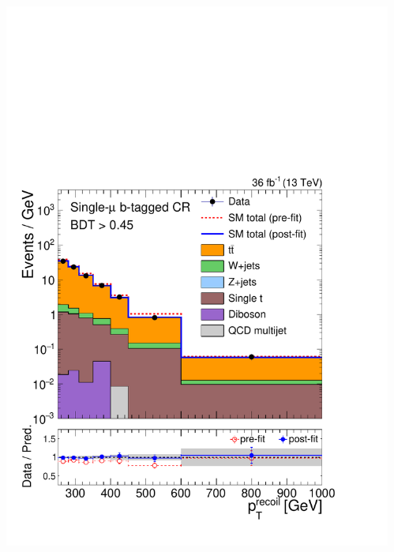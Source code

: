\documentclass[aspectratio=169,xcolor=dvipsnames,,table,compress]{beamer}
\begin{document}
\begin{frame}[t]
\begin{columns}[T]
\begin{column}{0.125\textwidth}
      \includegraphics[width=\textwidth]{../figures/monotop/postfit/stackedPostfit_singlemuontop_monotop.pdf}
    \end{column}
    \begin{column}{0.125\textwidth}

\end{column}
\end{columns}
\end{frame}
\end{document}
